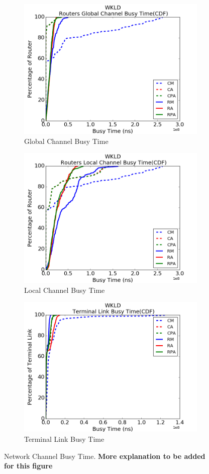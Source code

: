 \documentclass[conference,compsoc]{IEEEtran}
\begin{document}
\begin{figure}[t!]
    \centering   
    \begin{subfigure}[t]{0.32\textwidth}
        \centering
        \includegraphics[height=1.8 in]{wkld/gc-stime}
        \caption{Global Channel Busy Time}
        \label{fig:global-channel-stime}
    \end{subfigure}%
     \hspace{1em}%
    \begin{subfigure}[t]{0.32\textwidth}
        \centering
        \includegraphics[height=1.8 in]{wkld/lc-stime}
        \caption{Local Channel Busy Time}
        \label{fig:local-channel-stime}
    \end{subfigure}%
    \hspace{1em}%
    \begin{subfigure}[t]{0.32\textwidth}
        \centering
        \includegraphics[height=1.8 in]{wkld/tl-stime}
        \caption{Terminal Link Busy Time}
        \label{fig:terminal-link-stime}
    \end{subfigure}%
   \caption{Network Channel Busy Time. \textbf{More explanation to be added for this figure}}
   \label{fig:wkld-network-stime}
\end{figure}
\end{document}
